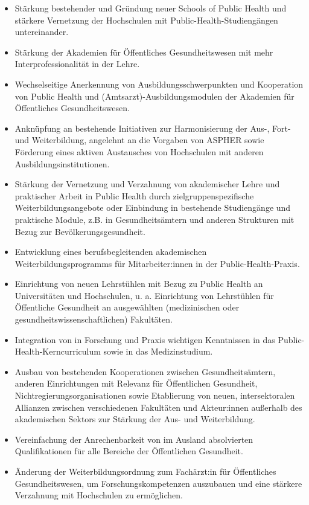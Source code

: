 \documentclass{article}
\begin{document}
\begin{itemize}
\item Stärkung bestehender und Gründung neuer Schools of Public Health und stärkere Vernetzung der Hochschulen mit Public-Health-Studiengängen untereinander. 


\item Stärkung der Akademien für Öffentliches Gesundheitswesen mit mehr Interprofessionalität in der Lehre.


\item Wechselseitige Anerkennung von Ausbildungsschwerpunkten und Kooperation von Public Health und (Amtsarzt)-Ausbildungsmodulen der Akademien für Öffentliches Gesundheitswesen.


\item Anknüpfung an bestehende Initiativen zur Harmonisierung der Aus-, Fort- und Weiterbildung, angelehnt an die Vorgaben von ASPHER sowie Förderung eines aktiven Austausches von Hochschulen mit anderen Ausbildungsinstitutionen.


\item Stärkung der Vernetzung und Verzahnung von akademischer Lehre und praktischer Arbeit in Public Health durch zielgruppenspezifische Weiterbildungsangebote oder Einbindung in bestehende Studiengänge und praktische Module, z.B. in Gesundheitsämtern und anderen Strukturen mit Bezug zur Bevölkerungsgesundheit.


\item Entwicklung eines berufsbegleitenden akademischen Weiterbildungsprogramms für Mitarbeiter:innen in der Public-Health-Praxis.


\item Einrichtung von neuen Lehrstühlen mit Bezug zu Public Health an Universitäten und Hochschulen, u. a. Einrichtung von Lehrstühlen für Öffentliche Gesundheit an ausgewählten (medizinischen oder gesundheitswissenschaftlichen) Fakultäten.


\item Integration von in Forschung und Praxis wichtigen Kenntnissen in das Public-Health-Kerncurriculum sowie in das Medizinstudium.


\item Ausbau von bestehenden Kooperationen zwischen Gesundheitsämtern, anderen Einrichtungen mit Relevanz für Öffentlichen Gesundheit, Nichtregierungsorganisationen sowie Etablierung von neuen, intersektoralen Allianzen zwischen verschiedenen Fakultäten und Akteur:innen außerhalb des akademischen Sektors zur Stärkung der Aus- und Weiterbildung.


\item Vereinfachung der Anrechenbarkeit von im Ausland absolvierten Qualifikationen für alle Bereiche der Öffentlichen Gesundheit.


\item Änderung der Weiterbildungsordnung zum Fachärzt:in für Öffentliches Gesundheitswesen, um Forschungskompetenzen auszubauen und eine stärkere Verzahnung mit Hochschulen zu ermöglichen.


\end{itemize}
\end{document}
